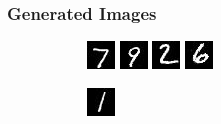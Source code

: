 \documentclass[12pt, fleqn, titlepage]{article}
\newcommand\skipper{1.4pt}
\newcommand\ripper{2.5pt}
\begin{document}
\subsubsection{Generated Images}
\begin{figure}[H]
	\centering
	\begin{subfigure}[b]{0.7\textwidth}
		\centering
		\includegraphics[width=0.22\linewidth]{imgs/MNIST_GAN_normal_real_0}
		\hskip\skipper
		\includegraphics[width=0.22\linewidth]{imgs/MNIST_GAN_normal_fake_0}
		\hskip\skipper
		\includegraphics[width=0.22\linewidth]{imgs/MNIST_GAN_normal_real_1}
		\hskip\skipper
		\includegraphics[width=0.22\linewidth]{imgs/MNIST_GAN_normal_fake_1}
	\end{subfigure}
	\vskip\ripper
	\begin{subfigure}[b]{0.7\textwidth}
		\centering
		\includegraphics[width=0.22\linewidth]{imgs/MNIST_GAN_normal_real_2}
		\hskip\skipper

\end{subfigure}
\end{figure}
\end{document}
